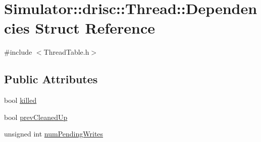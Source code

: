 \hypertarget{struct_simulator_1_1drisc_1_1_thread_1_1_dependencies}{\section{Simulator\+:\+:drisc\+:\+:Thread\+:\+:Dependencies Struct Reference}
\label{struct_simulator_1_1drisc_1_1_thread_1_1_dependencies}
}


{\ttfamily \#include $<$Thread\+Table.\+h$>$}

\subsection*{Public Attributes}
\begin{DoxyCompactItemize}
\item 
bool \hyperlink{struct_simulator_1_1drisc_1_1_thread_1_1_dependencies_a7c4d350166518dc939f086a293b3d512}{killed}
\item 
bool \hyperlink{struct_simulator_1_1drisc_1_1_thread_1_1_dependencies_a913f307ebfca3f9359fc13b4cdf71992}{prev\+Cleaned\+Up}
\item 
unsigned int \hyperlink{struct_simulator_1_1drisc_1_1_thread_1_1_dependencies_a681dea9bcbb9eb51ee072b8bb4d55cea}{num\+Pending\+Writes}
\end{DoxyCompactItemize}


